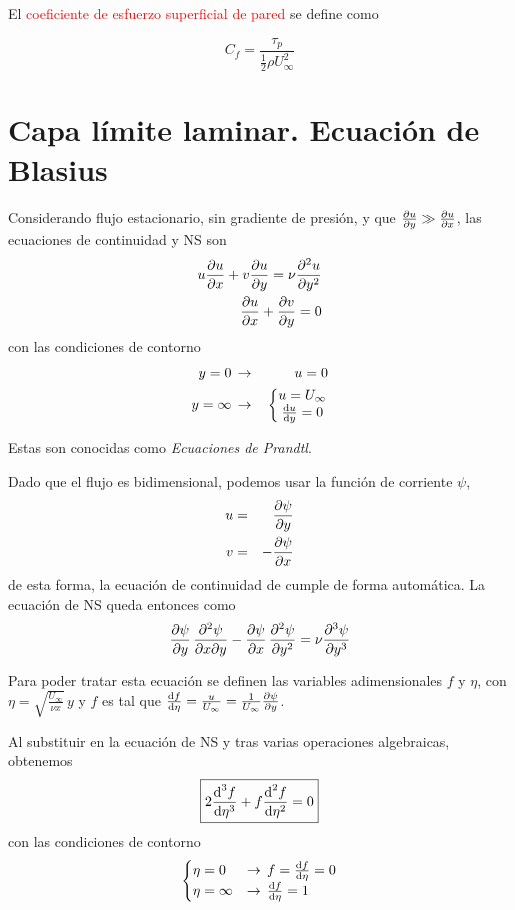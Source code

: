 	El \textcolor{red}{coeficiente de esfuerzo superficial de pared} se
	define como 
	
\begin{equation}
		C_{f}=\frac{\tau_{p}}{\frac{1}{2}\rho U_{\infty}^{2}}
\end{equation}
	
	


\section{Capa límite laminar. Ecuación de Blasius}

	
	Considerando flujo estacionario, sin gradiente de presión, y que $\frac{\partial u}{\partial y}\gg\frac{\partial u}{\partial x}$,
	las ecuaciones de continuidad y NS son 
	\begin{eqnarray}
		u\frac{\partial u}{\partial x}+v\frac{\partial u}{\partial y}=\nu\frac{\partial^2 u}{\partial y^2}\\
		\frac{\partial u}{\partial x}+\frac{\partial v}{\partial y}=0
	\end{eqnarray}
	con las condiciones de contorno 
	\begin{eqnarray*}
		y=0\, & \rightarrow & \,u=0\\
		y=\infty\, & \rightarrow & \,\left\{ \begin{matrix}u=U_{\infty}\\
			\frac{\textrm{d} u}{\textrm{d} y}=0
		\end{matrix}\right.
	\end{eqnarray*}
	
	Estas son conocidas como \textit{Ecuaciones de Prandtl}.
	

	
	Dado que el flujo es bidimensional, podemos usar la función de corriente
	$\psi$, 
	\begin{eqnarray*}
		u & = & \frac{\partial \psi}{\partial y}\\
		v & = & -\frac{\partial \psi}{\partial x}
	\end{eqnarray*}
	de esta forma, la ecuación de continuidad de cumple de forma automática.
	La ecuación de NS queda entonces como 
	\[
	\frac{\partial \psi}{\partial y}\,\frac{\partial^{2}\psi}{\partial x\partial y}-\frac{\partial \psi}{\partial x}\,\frac{\partial^2 \psi}{\partial y^2}=\nu\frac{\partial^{3}\psi}{\partial y^{3}}
	\]
	

	
	Para poder tratar esta ecuación se definen las variables adimensionales
	$f$ y $\eta$, con $\eta=\sqrt{\frac{U_{\infty}}{\nu x}}\,y$ y $f$
	es tal que $\frac{\textrm{d} f}{\textrm{d} \eta}=\frac{u}{U_{\infty}}=\frac{1}{U_{\infty}}\frac{\partial \psi}{\partial y}$.
	
	Al substituir en la ecuación de NS y tras varias operaciones algebraicas,
	obtenemos 
	\[
	\boxed{2\frac{\text{d}^{3}f}{\text{d}\eta^{3}}+f\frac{\text{d}^2 f}{\text{d} \eta^2}=0}
	\]
	con las condiciones de contorno
	\[
	\begin{cases}
		\eta=0 & \rightarrow\,f=\frac{\textrm{d} f}{\textrm{d} \eta}=0\\
		\eta=\infty & \rightarrow\,\frac{\textrm{d} f}{\textrm{d} \eta}=1
	\end{cases}
	\]
	
